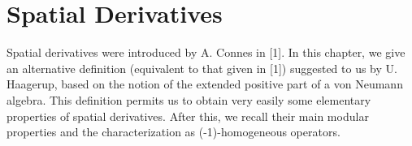 
% 
\chapter{Spatial Derivatives}
Spatial derivatives were introduced by A. Connes in [1]. In this chapter, we give an alternative definition (equivalent to that given in [1]) suggested to us by U. Haagerup, based on the notion of the extended positive part of a von Neumann algebra. This definition permits us to obtain very easily some elementary properties of spatial derivatives. After this, we recall their main modular properties and the characterization as (-1)-homogeneous operators.\par
